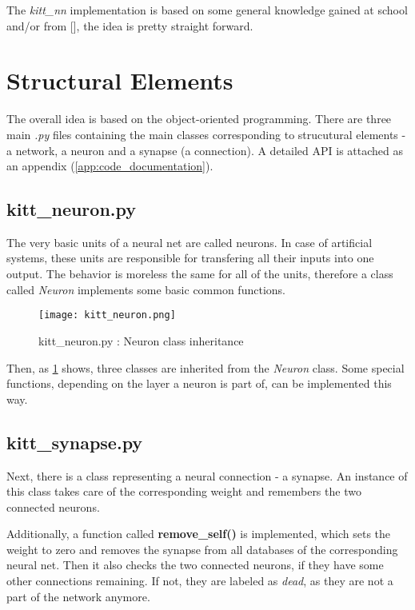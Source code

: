 The \textit{kitt\_nn} implementation is based on some general knowledge gained at school and/or from [], the idea is pretty straight forward.

\section{Structural Elements}
The overall idea is based on the object-oriented programming. There are three main \textit{.py} files containing the main classes corresponding to strucutural elements - a network, a neuron and a synapse (a connection). A detailed API is attached as an appendix (\ref{app:code_documentation}).

\subsection*{kitt\_neuron.py} \label{ssec:kitt_neuron}
The very basic units of a neural net are called neurons. In case of artificial systems, these units are responsible for transfering all their inputs into one output. The behavior is moreless the same for all of the units, therefore a class called \textit{Neuron} implements some basic common functions.

\begin{figure}[H]
  \centering
  \texttt{[image: kitt\_neuron.png]}
  \caption{kitt\_neuron.py : Neuron class inheritance}
  \label{img:kitt_neuron}
\end{figure}

Then, as \cref{img:kitt_neuron} shows, three classes are inherited from the \textit{Neuron} class. Some special functions, depending on the layer a neuron is part of, can be implemented this way.

\subsection*{kitt\_synapse.py} \label{ssec:kitt_synapse}
Next, there is a class representing a neural connection - a synapse. An instance of this class takes care of the corresponding weight and remembers the two connected neurons. 

Additionally, a function called \textbf{remove\_self()} is implemented, which sets the weight to zero and removes the synapse from all databases of the corresponding neural net. Then it also checks the two connected neurons, if they have some other connections remaining. If not, they are labeled as \textit{dead}, as they are not a part of the network anymore.


